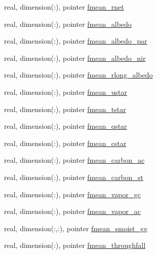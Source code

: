 \begin{DoxyCompactItemize}
\item 
real, dimension(\+:), pointer \hyperlink{structed__state__vars_1_1edtype_a75b68a9f2216690cdc48da2906069749}{fmean\+\_\+rnet}
\item 
real, dimension(\+:), pointer \hyperlink{structed__state__vars_1_1edtype_a4d2e5ad89ac1a0e79732e07f3cda8316}{fmean\+\_\+albedo}
\item 
real, dimension(\+:), pointer \hyperlink{structed__state__vars_1_1edtype_aae3619c721cf93d0f1dc6913f3cda0c5}{fmean\+\_\+albedo\+\_\+par}
\item 
real, dimension(\+:), pointer \hyperlink{structed__state__vars_1_1edtype_a7c652f4a62a25a670843deb6a08419ce}{fmean\+\_\+albedo\+\_\+nir}
\item 
real, dimension(\+:), pointer \hyperlink{structed__state__vars_1_1edtype_ad441009f434a8c4abdd64757104c1d57}{fmean\+\_\+rlong\+\_\+albedo}
\item 
real, dimension(\+:), pointer \hyperlink{structed__state__vars_1_1edtype_a9fde3d7742a0376d40d023052590bfbe}{fmean\+\_\+ustar}
\item 
real, dimension(\+:), pointer \hyperlink{structed__state__vars_1_1edtype_a500420d115582aa96182fffaf95eca77}{fmean\+\_\+tstar}
\item 
real, dimension(\+:), pointer \hyperlink{structed__state__vars_1_1edtype_a52b73e1b1894d204678c0e4786d4d2ef}{fmean\+\_\+qstar}
\item 
real, dimension(\+:), pointer \hyperlink{structed__state__vars_1_1edtype_aa7750cf613366cc7892d6db24c6cb407}{fmean\+\_\+cstar}
\item 
real, dimension(\+:), pointer \hyperlink{structed__state__vars_1_1edtype_a7185c48aeea428d832be35766fdec49f}{fmean\+\_\+carbon\+\_\+ac}
\item 
real, dimension(\+:), pointer \hyperlink{structed__state__vars_1_1edtype_a767e1f7b46ac7ef5c60a65060e0080c8}{fmean\+\_\+carbon\+\_\+st}
\item 
real, dimension(\+:), pointer \hyperlink{structed__state__vars_1_1edtype_a39c2b0493d53507935043483309c62e7}{fmean\+\_\+vapor\+\_\+gc}
\item 
real, dimension(\+:), pointer \hyperlink{structed__state__vars_1_1edtype_a36253e0938c9fcd56b0d5edf943f7c6f}{fmean\+\_\+vapor\+\_\+ac}
\item 
real, dimension(\+:,\+:), pointer \hyperlink{structed__state__vars_1_1edtype_a065e43a7c51ce54a2f0a98aef77ab3c7}{fmean\+\_\+smoist\+\_\+gg}
\item 
real, dimension(\+:), pointer \hyperlink{structed__state__vars_1_1edtype_aa5ef381b8b50c3768830b8c4b92635e9}{fmean\+\_\+throughfall}

\end{DoxyCompactItemize}
